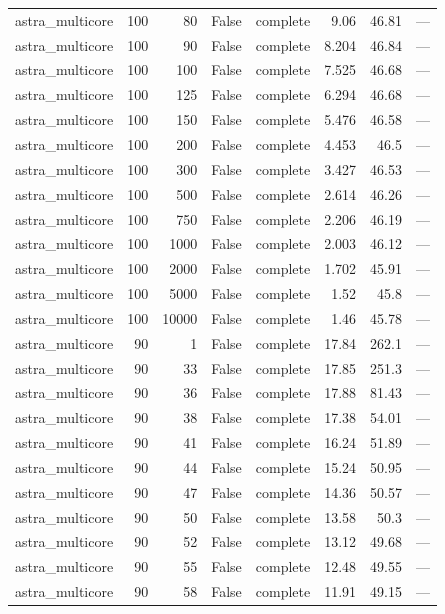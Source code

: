 \begin{tabular}{lrrrlrrl}
astra\_multicore & 100 & 80 & False & complete & 9.06 & 46.81 & — \\
astra\_multicore & 100 & 90 & False & complete & 8.204 & 46.84 & — \\
astra\_multicore & 100 & 100 & False & complete & 7.525 & 46.68 & — \\
astra\_multicore & 100 & 125 & False & complete & 6.294 & 46.68 & — \\
astra\_multicore & 100 & 150 & False & complete & 5.476 & 46.58 & — \\
astra\_multicore & 100 & 200 & False & complete & 4.453 & 46.5 & — \\
astra\_multicore & 100 & 300 & False & complete & 3.427 & 46.53 & — \\
astra\_multicore & 100 & 500 & False & complete & 2.614 & 46.26 & — \\
astra\_multicore & 100 & 750 & False & complete & 2.206 & 46.19 & — \\
astra\_multicore & 100 & 1000 & False & complete & 2.003 & 46.12 & — \\
astra\_multicore & 100 & 2000 & False & complete & 1.702 & 45.91 & — \\
astra\_multicore & 100 & 5000 & False & complete & 1.52 & 45.8 & — \\
astra\_multicore & 100 & 10000 & False & complete & 1.46 & 45.78 & — \\
astra\_multicore & 90 & 1 & False & complete & 17.84 & 262.1 & — \\
astra\_multicore & 90 & 33 & False & complete & 17.85 & 251.3 & — \\
astra\_multicore & 90 & 36 & False & complete & 17.88 & 81.43 & — \\
astra\_multicore & 90 & 38 & False & complete & 17.38 & 54.01 & — \\
astra\_multicore & 90 & 41 & False & complete & 16.24 & 51.89 & — \\
astra\_multicore & 90 & 44 & False & complete & 15.24 & 50.95 & — \\
astra\_multicore & 90 & 47 & False & complete & 14.36 & 50.57 & — \\
astra\_multicore & 90 & 50 & False & complete & 13.58 & 50.3 & — \\
astra\_multicore & 90 & 52 & False & complete & 13.12 & 49.68 & — \\
astra\_multicore & 90 & 55 & False & complete & 12.48 & 49.55 & — \\
astra\_multicore & 90 & 58 & False & complete & 11.91 & 49.15 & — \\

\end{tabular}
